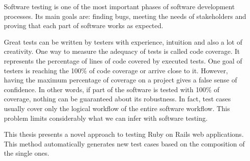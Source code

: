 
Software testing is one of the most important phases of software development processes. Its main goals are: finding bugs, meeting the needs of stakeholders and proving that each part of software works as expected.

Great tests can be written by testers with experience, intuition and also a lot of creativity. One way to measure the adequacy of tests is called code coverage. It represents the percentage of lines of code covered by executed tests. One goal of testers is reaching the 100\% of code coverage or arrive close to it. However, having the maximum percentage of coverage on a project gives a false sense of confidence. In other words, if part of the software is tested with 100\% of coverage, nothing can be guaranteed about its robustness. In fact, test cases usually cover only the logical workflow of the entire software workflow. This problem limits considerably what we can infer with software testing.

This thesis presents a novel approach to testing Ruby on Rails web applications. This method automatically generates new test cases based on the composition of the single ones.